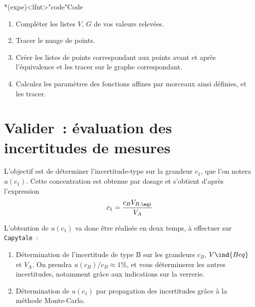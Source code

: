 \documentclass[../main/main.tex]{subfiles}
\begin{document}
\begin{tcb}*(expe)<lfnt>"code"{Code}
	\begin{enumerate}
		\item Compléter les listes $V$, $G$ de vos valeurs relevées.
		\item Tracer le nuage de points.
		\item Créer les listes de points correspondant aux points avant et après
		      l'équivalence et les tracer sur le graphe correspondant.
		\item Calculez les paramètres des fonctions affines par morceaux ainsi
		      définies, et les tracer.
	\end{enumerate}
\end{tcb}





\section{Valider~: évaluation des incertitudes de mesures}

L'objectif est de déterminer l'incertitude-type sur la grandeur $c_1$, que l'on
notera $u(c_1)$. Cette concentration est obtenue par dosage et s'obtient d'après
l'expression
\[
	c_1 = \frac{c_B V_{B,\eqi}}{V_A}
\]

L'obtention de $u(c_1)$ va donc être réalisée en deux temps, à effectuer sur
\texttt{Capytale}~:
\begin{enumerate}
	\item Détermination de l'incertitude de type B sur les grandeurs $c_B$,
	      $V\ind{Beq}$ et $V_A$. On prendra $u(c_B)/c_B \approx 1 \%$, et vous
	      déterminerez les autres incertitudes, notamment grâce aux indications
	      sur la verrerie.
	\item Détermination de $u(c_1)$ par propagation des incertitudes grâce à la
	      méthode Monte-Carlo.
\end{enumerate}

\end{document}
